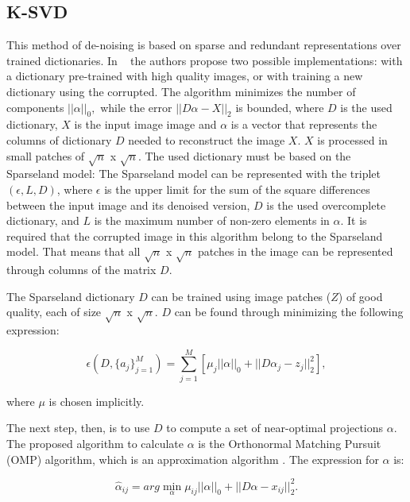 \subsection{K-SVD} \label{sc:description-ksvd}
This method of de-noising is based on sparse and redundant representations over trained dictionaries. In ~\cite{ksvd} the authors propose two possible implementations: with a dictionary pre-trained with high quality images, or with training a new dictionary using the corrupted. The algorithm minimizes the number of components $||\alpha||_{0}, $ while the error $||D\alpha-X||_{2}$ is bounded, where $D$ is the used dictionary, $X$ is the input image image and $\alpha$ is a vector that represents the columns of dictionary $D$ needed to reconstruct the image $X$. $X$ is processed in small patches of $\sqrt{n}$ x $\sqrt{n}$. The used dictionary must be based on the Sparseland model: The Sparseland model can be represented with the triplet $(\epsilon,L,D)$, where $\epsilon$ is the upper limit for the sum of the square differences between the input image and its denoised version, $D$ is the used overcomplete dictionary, and $L$ is the maximum number of non-zero elements in $\alpha$. It is required that the corrupted image in this algorithm belong to the Sparseland model. That means that all $\sqrt{n}$ x $\sqrt{n}$ patches in the image can be represented through columns of the matrix $D$.

The Sparseland dictionary $D$ can be trained using image patches ($Z$) of good quality, each of size $\sqrt{n}$ x $\sqrt{n}$. $D$ can be found through minimizing the following expression:

\begin{equation}
    \epsilon(D,\{a_{j}\}_{j=1}^{M})=\displaystyle \sum_{j=1}^{M}[\mu_{j}||\alpha||_{0}+||D\alpha_{j}-z_{j}||_{2}^{2}],
    \label{eq:ksvd_1}
\end{equation}

where $\mu$ is chosen implicitly. 

The next step, then, is to use $D$ to compute a set of near-optimal projections $\alpha$. The proposed algorithm to calculate $\alpha$ is the Orthonormal Matching Pursuit (OMP) algorithm, which is an approximation algorithm \cite{ksvd}. The expression for $\alpha$ is:

\begin{equation}
    \hat{\alpha}_{ij}=arg \displaystyle\min_{\alpha} \mu_{ij}||\alpha||_{0}+||D\alpha-x_{ij}||_{2}^{2}.
    \label{eq:ksvd_2}
\end{equation}

